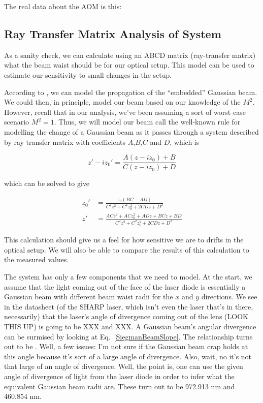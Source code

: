 The real data about the AOM is this: 


\subsection{Ray Transfer Matrix Analysis of System}
As a sanity check, we can calculate using an ABCD matrix (ray-transfer matrix) what the beam waist should be for our optical setup. This model can be used to estimate our sensitivity to small changes in the setup. 


According to \cite{SiegmanBeamQuality}, we can model the propagation of the ``embedded'' Gaussian beam. We could then, in principle, model our beam based on our knowledge of the $M^2$. However, recall that in our analysis, we've been assuming a sort of worst case scenario $M^2=1$. Thus, we will model our beam call the well-known rule for modelling the change of a Gaussian beam as it passes through a system described by ray transfer matrix with coefficients $A$,$B$,$C$ and $D$, which is 

\begin{equation}
z'-iz_0'=\frac{A(z-iz_0)+B}{C(z-iz_0)+D}
\end{equation}
\cite{BYUOpticsBook}

which can be solved to give 

\begin{align}
z_0' &= \frac{ z_0 (BC-AD)}{C^2z^2+C^2z_0^2+2 C D z + D^2} \\
z' &=\frac{AC z^2+ACz_0^2+ADz+BCz+BD}{C^2z^2+C^2z_0^2+2 C D z + D^2}
\end{align}

This calculation should give us a feel for how sensitive we are to drifts in the optical setup. We will also be able to compare the results of this calculation to the measured values. 

The system has only a few components that we need to model. At the start, we assume that the light coming out of the face of the laser diode is essentially a Gaussian beam with different beam waist radii for the $x$ and $y$ directions. We see in the datasheet (of the SHARP laser, which isn't even the laser that's in there, necessarily) that the laser's angle of divergence coming out of the lens (LOOK THIS UP) is going to be XXX and XXX. A Gaussian beam's angular divergence can be surmised by looking at Eq.\ \ref{SiegmanBeamSlope}. The relationship turns out to be \cite{MellesGriotGaussian}. Well, a few issues: I'm not sure if the Gaussian beam crap holds at this angle because it's sort of a large angle of divergence. Also, wait, no it's not that large of an angle of divergence. Well, the point is, one can use the given angle of divergence of light from the laser diode in order to infer what the equivalent Gaussian beam radii are. These turn out to be 972.913 nm and 460.854 nm. 

